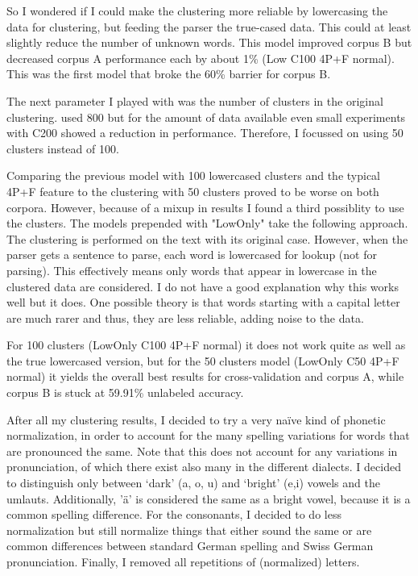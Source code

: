 \documentclass[11pt,letterpaper, covington]{article}
\begin{document}
So I wondered if I could make the clustering more reliable by lowercasing the data for clustering, but feeding the parser the true-cased data. This could at least slightly reduce the number of unknown words. This model improved corpus B but decreased corpus A performance each by about 1\%  (Low C100 4P+F normal).  This was the first model that broke the 60\% barrier for corpus B.


The next parameter I played with was the number of clusters in the original clustering. \cite{KCC08} used 800 but for the amount of data available even small experiments with C200 showed a reduction in performance. Therefore, I focussed on using 50 clusters instead of 100. 

Comparing the previous model with 100 lowercased clusters and the typical 4P+F feature to the clustering with 50 clusters proved to be worse on both corpora. However, because of a mixup in results I found a third possiblity to use the clusters. The models prepended with "LowOnly" take the following approach. The clustering is performed on the text with its original case. However, when the parser gets a sentence to parse, each word is lowercased for lookup (not for parsing). This effectively means only words that appear in lowercase in the clustered data are considered. I do not have a good explanation why this works well but it does. One possible theory is that words starting with a capital letter are much rarer and thus, they are less reliable, adding noise to the data.

For 100 clusters (LowOnly C100 4P+F normal) it does not work quite as well as the true lowercased version, but for the 50 clusters model (LowOnly C50 4P+F normal) it yields the overall best results for cross-validation and corpus A, while corpus B is stuck at 59.91\% unlabeled accuracy. 


After all my clustering results, I decided to try a very naïve kind of phonetic normalization, in order to account for the many spelling variations for words that are pronounced the same. Note that this does not account for any variations in pronunciation, of which there exist also many in the different dialects. I decided to distinguish only between `dark' (a, o, u) and `bright' (e,i) vowels and the umlauts. Additionally, 'ä' is considered the same as a bright vowel, because it is a common spelling difference. For the consonants, I decided to do less normalization but still normalize things that either sound the same or are common differences between standard German spelling and Swiss German pronunciation. Finally, I removed all repetitions of (normalized) letters.
\end{document}
